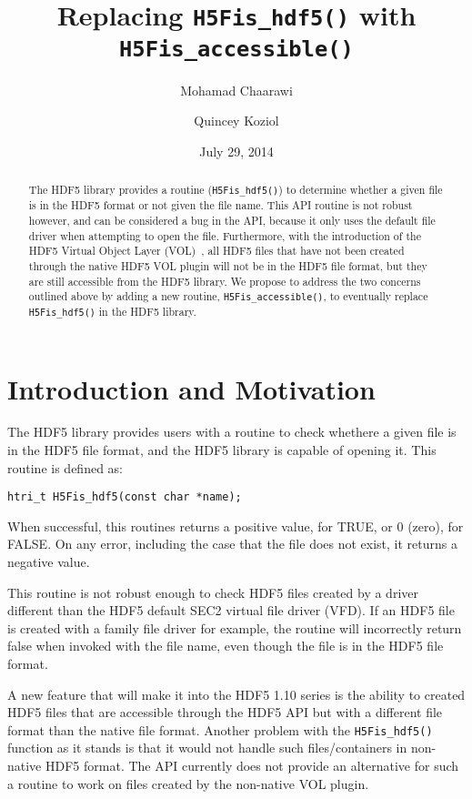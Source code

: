 \documentclass[letterpaper,hyper]{THG_RFC}
\title{Replacing {\tt H5Fis\_hdf5()} with {\tt H5Fis\_accessible()}}
\author{Mohamad Chaarawi}
\author{Quincey Koziol}
\date{July 29, 2014}
\begin{document}
\maketitle

\begin{abstract}
The HDF5 library provides a routine ({\tt H5Fis\_hdf5()}) to determine whether a given file is in the HDF5 format or not given the file name. This API routine is not robust however, and can be considered a bug in the API, because it only uses the default file driver when attempting to open the file. Furthermore, with the introduction of the HDF5 Virtual Object Layer (VOL)~\cite{vol-rfc}, all HDF5 files that have not been created through the native HDF5 VOL plugin will not be in the HDF5 file format, but they are still accessible from the HDF5 library. We propose to address the two concerns outlined above by adding a new routine, {\tt H5Fis\_accessible()}, to eventually replace {\tt H5Fis\_hdf5()} in the HDF5 library.
\end{abstract}

\section{Introduction and Motivation}
The HDF5 library provides users with a routine to check whethere a given file is in the HDF5 file format, and the HDF5 library is capable of opening it. This routine is defined as:
\begin{lstlisting}
htri_t H5Fis_hdf5(const char *name);
\end{lstlisting}
When successful, this routines returns a positive value, for TRUE, or 0 (zero), for FALSE. On any error, including the case that the file does not exist, it returns a negative value.

This routine is not robust enough to check HDF5 files created by a driver different than the HDF5 default SEC2 virtual file driver (VFD). If an HDF5 file is created with a family file driver for example, the routine will incorrectly return false when invoked with the file name, even though the file is in the HDF5 file format.

A new feature that will make it into the HDF5 1.10 series is the ability to created HDF5 files that are accessible through the HDF5 API but with a different file format than the native file format. Another problem with the {\tt H5Fis\_hdf5()} function as it stands is that it would not handle such files/containers in non-native HDF5 format. The API currently does not provide an alternative for such a routine to work on files created by the non-native VOL plugin.  
\end{document}
